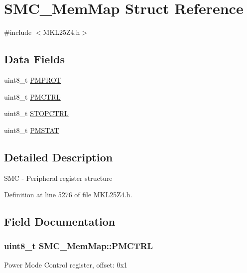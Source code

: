\hypertarget{struct_s_m_c___mem_map}{}\section{S\+M\+C\+\_\+\+Mem\+Map Struct Reference}
\label{struct_s_m_c___mem_map}


{\ttfamily \#include $<$M\+K\+L25\+Z4.\+h$>$}

\subsection*{Data Fields}
\begin{DoxyCompactItemize}
\item 
uint8\+\_\+t \hyperlink{struct_s_m_c___mem_map_afd03d93a7823dc65f53216dca15a2a95}{P\+M\+P\+R\+OT}
\item 
uint8\+\_\+t \hyperlink{struct_s_m_c___mem_map_a2a5d946bb55640fd179c4065937bea5c}{P\+M\+C\+T\+RL}
\item 
uint8\+\_\+t \hyperlink{struct_s_m_c___mem_map_a3065a98baea0fc4c0099b9782554a662}{S\+T\+O\+P\+C\+T\+RL}
\item 
uint8\+\_\+t \hyperlink{struct_s_m_c___mem_map_a0fddef87e229c4cf1b3be0d29589e964}{P\+M\+S\+T\+AT}
\end{DoxyCompactItemize}


\subsection{Detailed Description}
S\+MC -\/ Peripheral register structure 

Definition at line 5276 of file M\+K\+L25\+Z4.\+h.



\subsection{Field Documentation}
\subsubsection[{\texorpdfstring{P\+M\+C\+T\+RL}{PMCTRL}}]{\setlength{\rightskip}{0pt plus 5cm}uint8\+\_\+t S\+M\+C\+\_\+\+Mem\+Map\+::\+P\+M\+C\+T\+RL}\hypertarget{struct_s_m_c___mem_map_a2a5d946bb55640fd179c4065937bea5c}{}\label{struct_s_m_c___mem_map_a2a5d946bb55640fd179c4065937bea5c}
Power Mode Control register, offset\+: 0x1 

